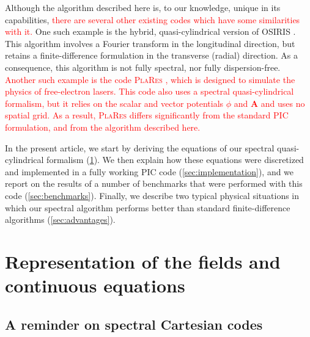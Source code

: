 \documentclass[1p,times]{elsarticle}
\renewcommand{\vec}[1]{\boldsymbol{#1}}
\newcommand{\comment}[1]{\textcolor{red}{#1}}
\begin{document}
Although the algorithm described here is, to our knowledge, unique in
its capabilities, \comment{there are several other existing codes
  which have some similarities with it.} One such example is the
hybrid, quasi-cylindrical version of \textsc{OSIRIS} \citep{Yuarxiv2015}. This algorithm
involves a Fourier transform in the longitudinal direction, but
retains a finite-difference formulation in the transverse (radial)
direction. As a consequence, this algorithm is not fully spectral, nor
fully dispersion-free. 
\comment{Another such example is the code \textsc{PlaRes} 
\citep{AndriyashJCP2015}, which is designed to simulate the physics of
free-electron lasers. This code also uses a spectral quasi-cylindrical
formalism, but it relies on the scalar and vector potentials
$\phi$ and $\vec{A}$ and uses no spatial grid. As a result, \textsc{PlaRes} differs significantly from the
standard PIC formulation, and from the algorithm described here.}

In the present article, we start by deriving the equations of our
spectral quasi-cylindrical formalism (\cref{sec:theory}). We then explain
how these equations were discretized and implemented in a fully
working PIC code (\cref{sec:implementation}), and we report on the
results of a number of benchmarks that were performed with this code 
(\cref{sec:benchmarks}). Finally, we describe two typical physical situations in
which our spectral algorithm performs better than standard 
finite-difference algorithms (\cref{sec:advantages}).

\section{Representation of the fields and continuous equations}
\label{sec:theory}

\subsection{A reminder on spectral Cartesian codes}
\end{document}
